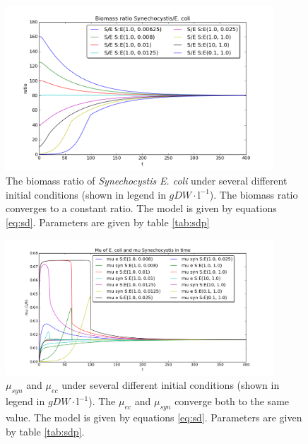\documentclass[12pt]{report}
\begin{document}
\begin{figure}[!ht]
 \begin{center}  
     \includegraphics[width=10cm]{ratios_interdependent_2.png}
     \caption{The biomass ratio of \textit{Synechocystis} \textit{E. coli} under several different initial conditions (shown in legend in $gDW\cdot \text{l}^{-1}$). The biomass ratio converges to a constant ratio. The model is given by equations \ref{eq:sd}. Parameters are given by table \ref{tab:sdp}}
    \label{fig:subrat2}
    \end{center}
\end{figure}


\begin{figure}[!ht]
 \begin{center}  
     \includegraphics[width=10cm]{ratios_interdependence_mus.png}
     \caption{$\mu_{syn}$ and $\mu_{ec}$ under several different initial conditions (shown in legend in $gDW\cdot \text{l}^{-1}$). The $\mu_{ec}$ and $\mu_{syn}$ converge both to the same value. The model is given by equations \ref{eq:sd}. Parameters are given by table \ref{tab:sdp}.}
    \label{fig:submu}
    \end{center}
\end{figure}
\end{document}

